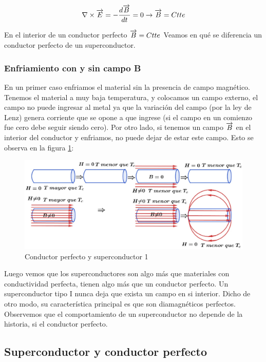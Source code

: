 \begin{equation}
	\nabla \times \overrightarrow{E}= -\frac{d\overrightarrow{B}}{dt} = 0 \rightarrow \overrightarrow{B} = Ctte
\end{equation}

En el interior de un conductor perfecto $\overrightarrow{B} = Ctte$ Veamos en qué se diferencia un conductor perfecto de un superconductor.

\subsubsection{Enfriamiento con y sin campo B}

En un primer caso enfriamos el material sin la presencia de campo magnético. Tenemos el material a muy baja temperatura, y colocamos un campo externo, el campo no puede ingresar al metal ya que la variación del campo (por la ley de Lenz) genera corriente que se opone a que ingrese (si el campo en un comienzo fue cero debe seguir siendo cero). Por otro lado, si tenemos un campo $\overrightarrow{B}$ en el interior del conductor y enfriamos, no puede dejar de estar este campo. Esto se observa en la figura \ref{fig:416}:

\begin{figure}[H]
    \centering
    \includegraphics[width=1.0\textwidth]{./Figures/fig416}
    \caption{Conductor perfecto y superconductor 1}
	\label{fig:416}
\end{figure}

Luego vemos que los superconductores son algo más que materiales con conductividad perfecta, tienen algo más que un conductor perfecto. Un superconductor tipo I nunca deja que exista un campo en si interior. Dicho de otro modo, su característica principal es que son diamagnéticos perfectos. Observemos que el comportamiento de un superconductor no depende de la historia, si el conductor perfecto.

\subsection{Superconductor y conductor perfecto}

